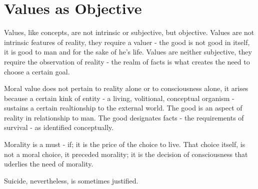     \section{Values as Objective}

        Values, like concepts, are not intrinsic or subjective, but objective. Values are not intrinsic features of reality, they require a valuer - the good is not good in itself, it is good to man and for the sake of he's life. Values are neither subjective, they require the observation of reality - the realm of facts is what creates the need to choose a certain goal.

        Moral value does not pertain to reality alone or to consciousness alone, it arises because a certain kink of entity - a living, volitional, conceptual organism - sustains a certain realtionship to the external world. The good is an aspect of reality in relationship to man. The good designates facts - the requirements of survival - as identified conceptually.

        Morality is  a must - if; it is the price of the choice to live. That choice itself, is not a moral choice, it preceded morality; it is the decision of consciousness that uderlies the need of morality.

        Suicide, nevertheless, is sometimes justified.




        